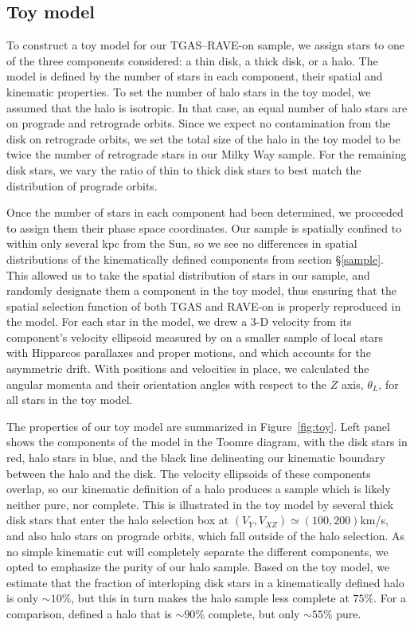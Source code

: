 \documentclass[apj, twocolappendix, numberedappendix, appendixfloats]{emulateapj}
\begin{document}
\subsection{Toy model}
\label{sec:toymodel}
To construct a toy model for our TGAS--RAVE-on sample, we assign stars to one of the three components considered: a thin disk, a thick disk, or a halo.
The model is defined by the number of stars in each component, their spatial and kinematic properties.
To set the number of halo stars in the toy model, we assumed that the halo is isotropic.
In that case, an equal number of halo stars are on prograde and retrograde orbits. 
Since we expect no contamination from the disk on retrograde orbits, we set the total size of the halo in the toy model to be twice the number of retrograde stars in our Milky Way sample.
For the remaining disk stars, we vary the ratio of thin to thick disk stars to best match the distribution of prograde orbits.

Once the number of stars in each component had been determined, we proceeded to assign them their phase space coordinates.
Our sample is spatially confined to within only several kpc from the Sun, so we see no differences in spatial distributions of the kinematically defined components from section \S\ref{sample}.
This allowed us to take the spatial distribution of stars in our sample, and randomly designate them a component in the toy model, thus ensuring that the spatial selection function of both TGAS and RAVE-on is properly reproduced in the model.
For each star in the model, we drew a 3-D velocity from its component's velocity ellipsoid measured by \citet{bensby2003} on a smaller sample of local stars with Hipparcos parallaxes and proper motions, and which accounts for the asymmetric drift.
With positions and velocities in place, we calculated the angular momenta and their orientation angles with respect to the $Z$ axis, $\theta_L$, for all stars in the toy model.

The properties of our toy model are summarized in Figure~\ref{fig:toy}.
Left panel shows the components of the model in the Toomre diagram, with the disk stars in red, halo stars in blue, and the black line delineating our kinematic boundary between the halo and the disk.
The velocity ellipsoids of these components overlap, so our kinematic definition of a halo produces a sample which is likely neither pure, nor complete.
This is illustrated in the toy model by several thick disk stars that enter the halo selection box at $(V_Y, V_{XZ}) \simeq (100,200)$\;km/s, and also halo stars on prograde orbits, which fall outside of the halo selection.
As no simple kinematic cut will completely separate the different components, we opted to emphasize the purity of our halo sample.
Based on the toy model, we estimate that the fraction of interloping disk stars in a kinematically defined halo is only $\sim10\%$, but this in turn makes the halo sample less complete at $75\%$.
For a comparison, \citet{ns2010} defined a halo that is $\sim90\%$ complete, but only $\sim55\%$ pure.
\end{document}
